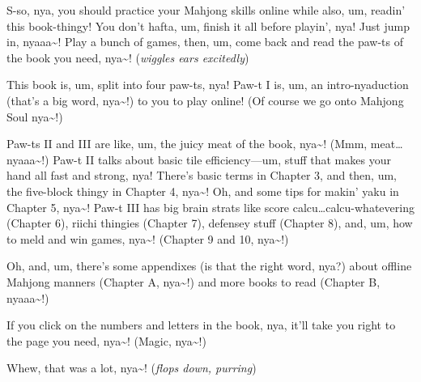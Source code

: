 S-so, nya, you should practice your Mahjong skills online while also, um,
readin’ this book-thingy! You don’t hafta, um, finish it all before playin’,
nya! Just jump in, nyaaa\textasciitilde! Play a bunch of games, then, um, come back and read
the paw-ts of the book you need, nya\textasciitilde! (\textit{wiggles ears excitedly})

This book is, um, split into four paw-ts, nya! Paw-t I is, um, an
intro-nyaduction (that’s a big word, nya\textasciitilde!) to you to play online!
(Of course we go onto Mahjong Soul nya\textasciitilde!)

Paw-ts II and III are like, um, the juicy meat of the book, nya\textasciitilde! (Mmm,
meat… nyaaa\textasciitilde!) Paw-t II talks about basic tile efficiency—um, stuff that makes
your hand all fast and strong, nya! There’s basic terms in Chapter 3, and then,
um, the five-block thingy in Chapter 4, nya\textasciitilde! Oh, and some tips for makin’ yaku
in Chapter 5, nya\textasciitilde! Paw-t III has big brain strats like score
calcu…calcu-whatevering (Chapter 6), riichi thingies (Chapter 7), defensey
stuff (Chapter 8), and, um, how to meld and win games, nya\textasciitilde! (Chapter 9 and 10,
nya\textasciitilde!)

Oh, and, um, there’s some appendixes (is that the right word, nya?) about
offline Mahjong manners (Chapter A, nya\textasciitilde!) and more books to read (Chapter B,
nyaaa\textasciitilde!)

If you click on the numbers and letters in the book, nya, it’ll take you
right to the page you need, nya\textasciitilde! (Magic, nya\textasciitilde!)

Whew, that was a lot, nya\textasciitilde! (\textit{flops down, purring})




